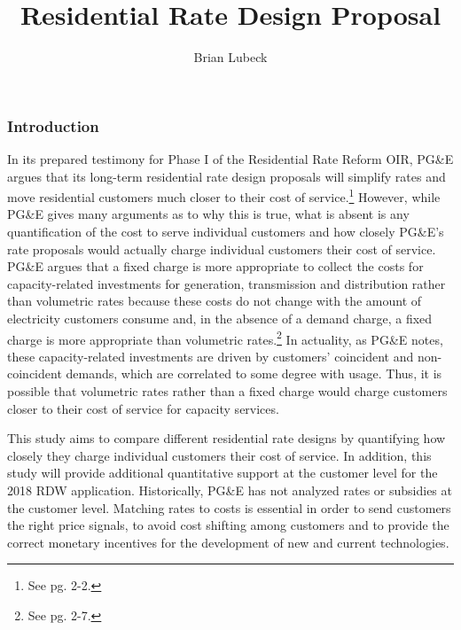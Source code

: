 \documentclass[12pt]{article}
\title{Residential Rate Design Proposal}
\author{Brian Lubeck}
\begin{document}
\maketitle


\subsubsection*{Introduction}

In its prepared testimony for Phase I of the Residential Rate Reform OIR, PG\&E argues that its long-term residential rate design proposals will simplify rates and move residential customers much closer to their cost of service.\footnote{See pg. 2-2.} However, while PG\&E gives many arguments as to why this is true, what is absent is any quantification of the cost to serve individual customers and how closely PG\&E's rate proposals would actually charge individual customers their cost of service. PG\&E argues that a fixed charge is more appropriate to collect the costs for capacity-related investments for generation, transmission and distribution rather than volumetric rates because these costs do not change with the amount of electricity customers consume and, in the absence of a demand charge, a fixed charge is more appropriate than volumetric rates.\footnote{See pg. 2-7.} In actuality, as PG\&E notes, these capacity-related investments are driven by customers' coincident and non-coincident demands, which are correlated to some degree with usage. Thus, it is possible that volumetric rates rather than a fixed charge would charge customers closer to their cost of service for capacity services. 

This study aims to compare different residential rate designs by quantifying how closely they charge individual customers their cost of service. In addition, this study will provide additional quantitative support at the customer level for the 2018 RDW application. Historically, PG\&E has not analyzed rates or subsidies at the customer level. Matching rates to costs is essential in order to send customers the right price signals, to avoid cost shifting among customers and to provide the correct monetary incentives for the development of new and current technologies.
\end{document}
